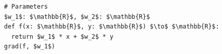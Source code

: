 \documentclass[border=10pt]{standalone}
\begin{document}
\begin{lstlisting}
# Parameters
$w_1$: $\mathbb{R}$, $w_2$: $\mathbb{R}$
def f(x: $\mathbb{R}$, y: $\mathbb{R}$) $\to$ $\mathbb{R}$:
  return $w_1$ * x + $w_2$ * y
grad(f, $w_1$)
\end{lstlisting}
\end{document}
